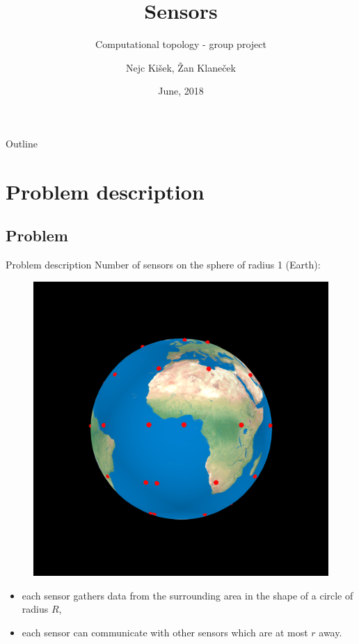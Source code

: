 \documentclass{beamer}
\title{Sensors}
\subtitle{Computational topology - group project}
\author[]{Nejc Kišek, Žan Klaneček}
\institute[] %
{

  Faculty of computer and information science\\
  University of Ljubljana}
\date{June, 2018}
\begin{document}
\begin{frame}
  \titlepage
\end{frame}

\begin{frame}{Outline}
  \tableofcontents
\end{frame}

\section{Problem description}
\subsection{Problem}

\begin{frame}{Problem description}{}
Number of sensors on the sphere of radius 1 (Earth):
\begin{figure}[!ht]
	
	\includegraphics[scale=0.1]{sensors01}
\end{figure}
\begin{itemize}
	\item {
		each sensor gathers data from the surrounding area in the shape of a circle of radius
		$R$,
	}
	\item {
		each sensor can communicate with other sensors which are at most $r$ away.
	}
\end{itemize}


\end{frame}
\end{document}
